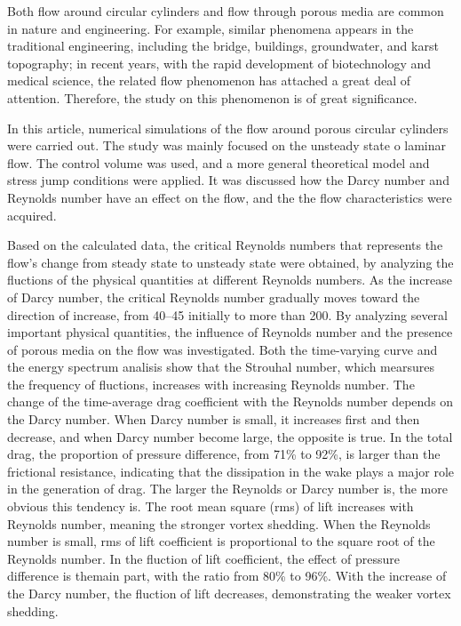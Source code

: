 \begin{eabstract}
Both flow around circular cylinders and flow through porous media are common in nature and engineering. For example, similar phenomena appears in the traditional engineering, including the bridge, buildings, groundwater, and karst topography; in recent years, with the rapid development of biotechnology and medical science, the related flow phenomenon has attached a great deal of attention. Therefore, the study on this phenomenon is of great significance.

In this article, numerical simulations of the flow around porous circular cylinders were carried out. The study was mainly focused on the unsteady state o laminar flow. The control volume was used, and a more general theoretical model and stress jump conditions were applied. It was discussed how the Darcy number and Reynolds number have an effect on the flow, and the the flow characteristics were acquired.

Based on the calculated data, the critical Reynolds numbers that represents the flow's change from steady state to unsteady state were obtained, by analyzing the fluctions of the physical quantities at different Reynolds numbers. As the increase of Darcy number, the critical Reynolds number gradually moves toward the direction of increase, from 40--45 initially to more than 200. By analyzing several important physical quantities, the influence of Reynolds number and the presence of porous media on the flow was investigated. Both the time-varying curve and the energy spectrum analisis show that the Strouhal number, which mearsures the frequency of fluctions, increases with increasing Reynolds number. The change of the time-average drag coefficient with the Reynolds number depends on the Darcy number. When Darcy number is small, it increases first and then decrease, and when Darcy number become large, the opposite is true. In the total drag, the proportion of pressure difference, from 71\% to 92\%, is larger than the frictional resistance, indicating that the dissipation in the wake plays a major role in the generation of drag. The larger the Reynolds or Darcy number is, the more obvious this tendency is. The root mean square (rms) of lift increases with Reynolds number, meaning the stronger vortex shedding. When the Reynolds number is small, rms of lift coefficient is proportional to the square root of the Reynolds number. In the fluction of lift coefficient, the effect of pressure difference is themain part, with the ratio from 80\% to 96\%. With the increase of the Darcy number, the fluction of lift decreases, demonstrating the weaker vortex shedding.
\end{eabstract}

